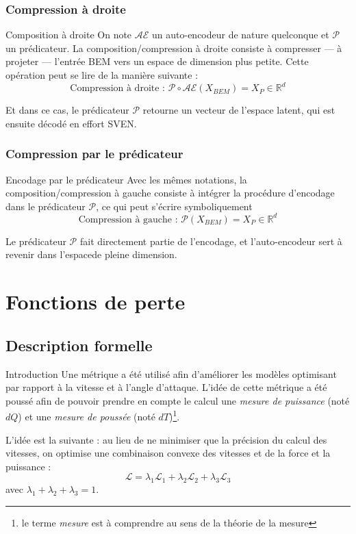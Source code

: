 \documentclass[
11pt,notheorems,hyperref={pdfauthor=whatever}
]{beamer}
\begin{document}
\subsubsection{Compression à droite}
\begin{frame}{Composition à droite}
    On note $\mathcal{AE}$ un auto-encodeur de nature quelconque et $\mathcal{P}$ un prédicateur. La composition/compression à droite consiste à compresser — à projeter — l'entrée BEM vers un espace de dimension plus petite. Cette opération peut se lire de la manière suivante :
    \[
    \text{Compression à droite : }  \mathcal{P} \circ \mathcal{AE} (X_{BEM}) = X_{P} \in \mathbb{R}^{d}
    \]

    Et dans ce cas, le prédicateur $\mathcal{P}$ retourne un vecteur de l'espace latent, qui est ensuite décodé en effort SVEN.
\end{frame}

\subsubsection{Compression par le prédicateur}

\begin{frame}{Encodage par le prédicateur}
    Avec les mêmes notations, la composition/compression à gauche consiste à intégrer la procédure d'encodage dans le prédicateur $\mathcal{P}$, ce qui peut s'écrire symboliquement 
    \[
        \text{Compression à gauche : } \mathcal{P}(X_{BEM}) = X_{P} \in \mathbb{R}^d
    \]

    Le prédicateur $\mathcal{P}$ fait directement partie de l'encodage, et l'auto-encodeur sert à revenir dans l'espacede pleine dimension.
\end{frame}

\section{Fonctions de perte}

\subsection{Description formelle}

\begin{frame}{Introduction}
    Une métrique a été utilisé afin d'améliorer les modèles optimisant
    par rapport à la vitesse et à l'angle d'attaque. L'idée de cette métrique a été poussé 
    afin de pouvoir prendre en compte le calcul une \textit{mesure de puissance} (noté $dQ$) et une \textit{mesure de poussée} (noté $dT$)\footnote{le terme \textit{mesure} est à comprendre au sens de la théorie de la mesure}.
    
    \vspace{0.2cm}

    L'idée est la suivante : au lieu de ne minimiser que la précision du calcul des vitesses, on optimise une combinaison convexe
    des vitesses et de la force et la puissance :
    \[
        \mathcal{L} = \lambda_1\mathcal{L}_1 + \lambda_2\mathcal{L}_2 + \lambda_3\mathcal{L}_3
    \]
    avec $\lambda_1 + \lambda_2 + \lambda_3 = 1$.
\end{frame}
\end{document}
